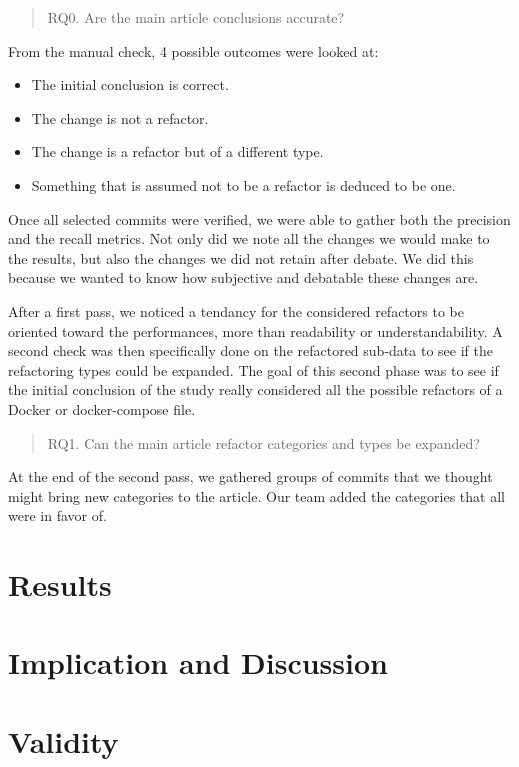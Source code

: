 \documentclass[lettersize,journal]{IEEEtran}
\begin{document}
\begin{quote}
        RQ0. Are the main article conclusions accurate?
\end{quote}
From the manual check, 4 possible outcomes were looked at:
\begin{itemize}
        \item The initial conclusion is correct.
        \item The change is not a refactor.
        \item The change is a refactor but of a different type.
        \item Something that is assumed not to be a refactor is deduced to be one.
\end{itemize}
Once all selected commits were verified, we were able to gather both the precision and the recall metrics.
Not only did we note all the changes we would make to the results, but also the changes we did not retain after debate.
We did this because we wanted to know how subjective and debatable these changes are.

After a first pass, we noticed a tendancy for the considered refactors to be oriented toward the performances, more than readability or understandability.
A second check was then specifically done on the refactored sub-data to see if the refactoring types could be expanded.
The goal of this second phase was to see if the initial conclusion of the study really considered all the possible refactors of a Docker or docker-compose file.

\begin{quote}
        RQ1. Can the main article refactor categories and types be expanded?
\end{quote}
At the end of the second pass, we gathered groups of commits that we thought might bring new categories to the article.
Our team added the categories that all were in favor of.

\section{Results}



\section{Implication and Discussion}

\section{Validity}
\end{document}
